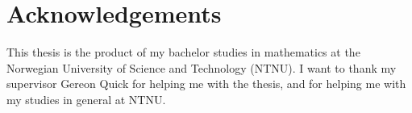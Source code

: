 \section*{Acknowledgements}
This thesis is the product of my bachelor studies in mathematics at the Norwegian University of Science and Technology (NTNU). I want to thank my supervisor Gereon Quick for helping me with the thesis, and for helping me with my studies in general at NTNU.